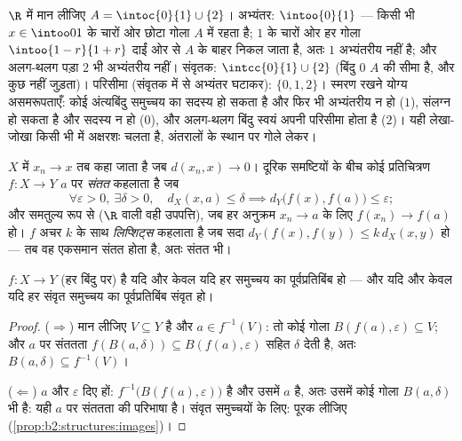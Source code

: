 \begin{example}[एक ही समुच्चय पर अभ्यंतर, संवृतक और परिसीमा]\label{ex:b2:metric:intclosure}
$\R$ में मान लीजिए $A = \intoc{0}{1} \cup \{2\}$। अभ्यंतर: $\intoo{0}{1}$ --- किसी भी $x \in \intoo01$ के चारों ओर छोटा
गोला $A$ में रहता है; $1$ के चारों ओर हर गोला $\intoo{1-r}{1+r}$ दाईं ओर से $A$ के
बाहर निकल जाता है, अतः $1$ अभ्यंतरीय नहीं है; और अलग-थलग पड़ा $2$ भी
अभ्यंतरीय नहीं। संवृतक: $\intcc{0}{1} \cup \{2\}$ (बिंदु $0$ $A$ की सीमा है, और कुछ नहीं
जुड़ता)। परिसीमा (संवृतक में से अभ्यंतर घटाकर): $\{0, 1, 2\}$। स्मरण रखने योग्य
असमरूपताएँ: कोई अंत्यबिंदु समुच्चय का सदस्य हो सकता है और फिर भी
अभ्यंतरीय न हो ($1$), संलग्न हो सकता है और सदस्य न हो ($0$), और
अलग-थलग बिंदु स्वयं अपनी परिसीमा होता है ($2$)। यही लेखा-जोखा किसी भी
 में अक्षरशः चलता है, अंतरालों के स्थान पर गोले लेकर।
\end{example}

\begin{definition}[सीमाएँ, संततता]\label{def:b2:metric:continuity}
$X$ में $x_n \to x$ तब कहा जाता है जब $d(x_n, x) \to 0$। दूरिक समष्टियों के बीच कोई
प्रतिचित्रण $f \colon X \to Y$ $a$ पर \emph{संतत} कहलाता है जब
\[
\forall \varepsilon > 0,\ \exists\delta > 0,\quad
d_X(x, a) \leq \delta \implies d_Y\bigl(f(x), f(a)\bigr) \leq
\varepsilon ;
\]
और समतुल्य रूप से ($\R$ वाली वही उपपत्ति), जब हर अनुक्रम $x_n \to a$ के लिए
$f(x_n) \to f(a)$ हो। $f$ अचर $k$ के साथ
\emph{लिप्शिट्स} कहलाता है जब सदा $d_Y(f(x), f(y)) \leq k\, d_X(x, y)$ हो --- तब वह
एकसमान संतत होता है, अतः संतत भी।
\end{definition}

\begin{theorem}[संततता का वैश्विक अभिलक्षण]\label{thm:b2:metric:globalcontinuity}
$f \colon X \to Y$ (हर बिंदु पर)  है यदि और केवल यदि हर  समुच्चय का
पूर्वप्रतिबिंब  हो --- और यदि और केवल यदि हर संवृत समुच्चय का
पूर्वप्रतिबिंब संवृत हो।
\end{theorem}

\begin{proof}
($\Rightarrow$) मान लीजिए $V \subseteq Y$  है और $a \in f^{-1}(V)$: तो कोई गोला $B(f(a), \varepsilon) \subseteq V$; और $a$ पर संततता
$f(B(a, \delta)) \subseteq B(f(a),
\varepsilon)$ सहित $\delta$ देती है, अतः $B(a, \delta) \subseteq f^{-1}(V)$।

($\Leftarrow$) $a$ और $\varepsilon$ दिए हों: $f^{-1}\bigl(B(f(a),
\varepsilon)\bigr)$  है और उसमें $a$ है, अतः उसमें कोई
गोला $B(a, \delta)$ भी है: यही $a$ पर संततता की परिभाषा है। संवृत समुच्चयों के
लिए: पूरक लीजिए (\cref{prop:b2:structures:images})।
\end{proof}

